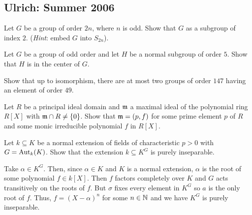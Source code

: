\subsection{Ulrich: Summer 2006}
\setcounter{exercise}{0}
\setcounter{equation}{0}

\begin{problem}
  Let \(G\) be a group of order \(2n\), where \(n\) is odd. Show that \(G\)
  as a subgroup of index \(2\). (\emph{Hint}: embed \(G\) into
  \(S_{2n}\)).
\end{problem}
\begin{solution}

\end{solution}

\begin{problem}
  Let \(G\) be a group of odd order and let \(H\) be a normal subgroup of
  order \(5\). Show that \(H\) is in the center of \(G\).
\end{problem}
\begin{solution}
\end{solution}

\begin{problem}
  Show that up to isomorphism, there are at most two groups of order
  \(147\) having an element of order \(49\).
\end{problem}
\begin{solution}
\end{solution}

\begin{problem}
  Let \(R\) be a principal ideal domain and \(\mathfrak{m}\) a maximal ideal of
  the polynomial ring \(R[X]\) with \(\mathfrak{m}\cap R\neq \{0\}\). Show that
  \(\mathfrak{m}=(p,f)\) for some prime element \(p\) of \(R\) and some monic
  irreducible polynomial \(f\) in \(R[X]\).
\end{problem}
\begin{solution}
\end{solution}

\begin{problem}
  Let \(k\subseteq K\) be a normal extension of fields of characteristic
  \(p>0\) with \(G=\operatorname{Aut}_k(K)\). Show that the extension \(k\subseteq K^G\)
  is purely inseparable.
\end{problem}
\begin{solution}
  Take \(\alpha\in K^G\). Then, since \(\alpha\in K\) and \(K\) is a normal
  extension, \(\alpha\) is the root of some polynomial \(f\in k[X]\). Then
  \(f\) factors completely over \(K\) and \(G\) acts transitively on the
  roots of \(f\). But \(\sigma\) fixes every element in \(K^G\) so \(a\) is
  the only root of \(f\). Thus, \(f=(X-\alpha)^n\) for some \(n\in\mathbb{N}\)
  and we have \(K^G\) is purely inseparable.
\end{solution}

